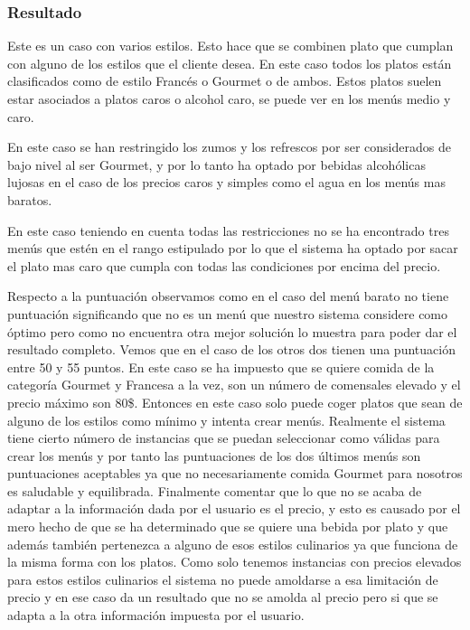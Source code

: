 \documentclass{article}
\begin{document}
\subsubsection{Resultado}
Este es un caso con varios estilos. Esto hace que se combinen plato que cumplan con alguno de los estilos que el cliente desea. En este caso todos los platos están clasificados como de estilo Francés o Gourmet o de ambos. Estos platos suelen estar asociados a platos caros o alcohol caro, se puede ver en los menús medio y caro.
\par
En este caso se han restringido los zumos y los refrescos por ser considerados de bajo nivel al ser Gourmet, y por lo tanto ha optado por bebidas alcohólicas lujosas en el caso de los precios caros y simples como el agua en los menús mas baratos.
\par
En este caso teniendo en cuenta todas las restricciones no se ha encontrado tres menús que estén en el rango estipulado por lo que el sistema ha optado por sacar el plato mas caro que cumpla con todas las condiciones por encima del precio.
\par
Respecto a la puntuación observamos como en el caso del menú barato no tiene puntuación significando que no es un menú que nuestro sistema considere como óptimo pero como no encuentra otra mejor solución lo muestra para poder dar el resultado completo. Vemos que en el caso de los otros dos tienen una puntuación entre 50 y 55 puntos. En este caso se ha impuesto que se quiere comida de la categoría Gourmet y Francesa a la vez, son un número de comensales elevado y el precio máximo son 80\$. Entonces en este caso solo puede coger platos que sean de alguno de los estilos como mínimo y intenta crear menús. Realmente el sistema tiene cierto número de instancias que se puedan seleccionar como válidas para crear los menús y por tanto las puntuaciones de los dos últimos menús son puntuaciones aceptables ya que no necesariamente comida Gourmet para nosotros es saludable y equilibrada.
Finalmente comentar que lo que no se acaba de adaptar a la información dada por el usuario es el precio, y esto es causado por el mero hecho de que se ha determinado que se quiere una bebida por plato y que además también pertenezca a alguno de esos estilos culinarios ya que funciona de la misma forma con los platos. Como solo tenemos instancias con precios elevados para estos estilos culinarios el sistema no puede amoldarse a esa limitación de precio y en ese caso da un resultado que no se amolda al precio pero si que se adapta a la otra información impuesta por el usuario.
\end{document}
